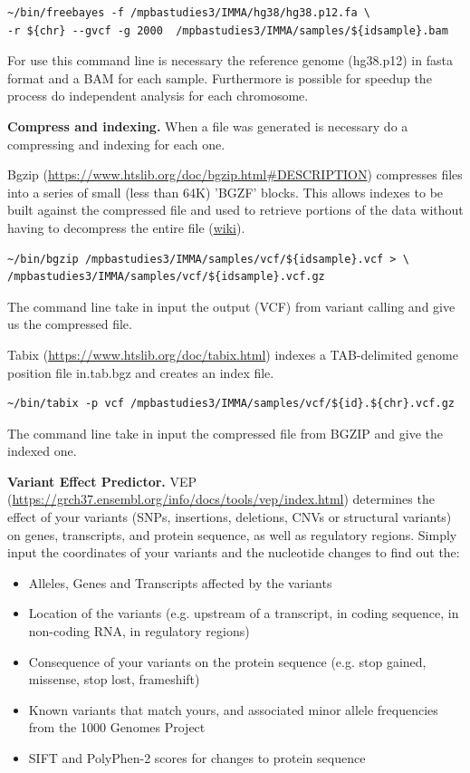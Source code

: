 \documentclass[
tikz,
11pt, %
oneside, %
english, %
singlespacing, %
headsepline, %
]{MastersDoctoralThesisV2} %
\begin{document}
\begin{verbatim}
~/bin/freebayes -f /mpbastudies3/IMMA/hg38/hg38.p12.fa \ 
-r ${chr} --gvcf -g 2000  /mpbastudies3/IMMA/samples/${idsample}.bam 
\end{verbatim}

For use this command line is necessary the reference genome (hg38.p12) in fasta format and a BAM for each sample. Furthermore is possible for speedup the process do independent analysis for each chromosome. 

\textbf{Compress and indexing.} When a file was generated is necessary do a compressing and indexing for each one. 

Bgzip (\url{https://www.htslib.org/doc/bgzip.html#DESCRIPTION}) compresses files into a series of small (less than 64K) 'BGZF' blocks. This allows indexes to be built against the compressed file and used to retrieve portions of the data without having to decompress the entire file (\href{https://www.htslib.org/doc/bgzip.html#DESCRIPTION}{wiki}).  

\begin{verbatim}
~/bin/bgzip /mpbastudies3/IMMA/samples/vcf/${idsample}.vcf > \
/mpbastudies3/IMMA/samples/vcf/${idsample}.vcf.gz
\end{verbatim}

The command line take in input the output (VCF) from variant calling and give us the compressed file.  

Tabix (\url{https://www.htslib.org/doc/tabix.html}) indexes a TAB-delimited genome position file in.tab.bgz and creates an index file.

\begin{verbatim}
~/bin/tabix -p vcf /mpbastudies3/IMMA/samples/vcf/${id}.${chr}.vcf.gz 
\end{verbatim}

The command line take in input the compressed file from BGZIP and give the indexed one.

\textbf{Variant Effect Predictor.}  VEP (\url{https://grch37.ensembl.org/info/docs/tools/vep/index.html}) determines the effect of your variants (SNPs, insertions, deletions, CNVs or structural variants) on genes, transcripts, and protein sequence, as well as regulatory regions.
Simply input the coordinates of your variants and the nucleotide changes to find out the:
\begin{itemize}
    \item Alleles, Genes and Transcripts affected by the variants
    \item Location of the variants (e.g. upstream of a transcript, in coding sequence, in non-coding RNA, in regulatory regions)
    \item Consequence of your variants on the protein sequence (e.g. stop gained, missense, stop lost, frameshift)
    \item Known variants that match yours, and associated minor allele frequencies from the 1000 Genomes Project
    \item  SIFT and PolyPhen-2 scores for changes to protein sequence
\end{itemize}
\end{document}
